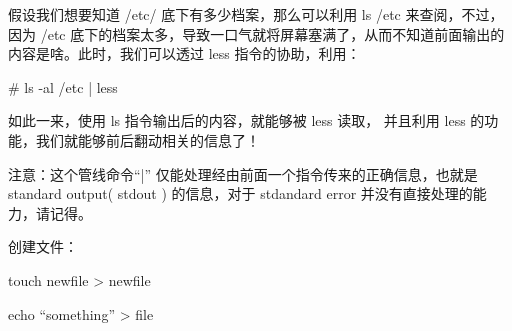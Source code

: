 假设我们想要知道 /etc/ 底下有多少档案，那么可以利用 ls /etc 来查阅，不过，因为 /etc 底下的档案太多，导致一口气就将屏幕塞满了，从而不知道前面输出的内容是啥。此时，我们可以透过 less 指令的协助，利用：
\begin{Code}
	# ls -al /etc | less
\end{Code}
如此一来，使用 ls 指令输出后的内容，就能够被 less 读取， 并且利用 less 的功能，我们就能够前后翻动相关的信息了！

注意：这个管线命令“|” 仅能处理经由前面一个指令传来的正确信息，也就是 standard output( stdout ) 的信息，对于 stdandard error 并没有直接处理的能力，请记得。

创建文件：
\begin{Code}
	touch newfile
	> newfile
	
	echo “something” > file
\end{Code}
